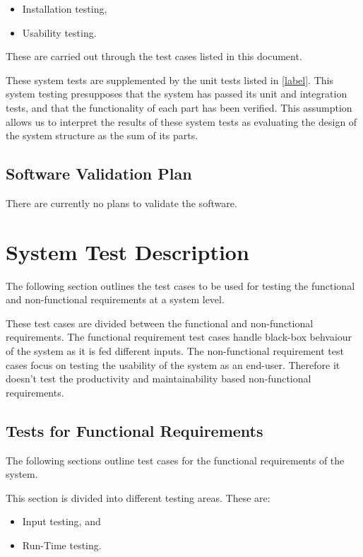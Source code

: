 \documentclass[12pt, titlepage]{article}
\begin{document}
\begin{itemize}
	\item Installation testing,
	\item Usability testing.
\end{itemize}

These are carried out through the test cases listed in this document.

These system tests are supplemented by the unit tests listed in \ref{label}. 
This system testing presupposes that the system has passed its unit and 
integration tests, and that the functionality of each part has been verified. 
This assumption allows us to interpret the results of these system tests as 
evaluating the design of the system structure as the sum of its parts.

\subsection{Software Validation Plan}
There are currently no plans to validate the software.

\section{System Test Description}
The following section outlines the test cases to be used for testing the 
functional and non-functional requirements at a system level.

These test cases are divided between the functional and non-functional 
requirements. The functional requirement test cases handle black-box behvaiour 
of the system as it is fed different inputs. The non-functional requirement 
test cases focus on testing the usability of the system as an end-user. 
Therefore it doesn't test the productivity and maintainability based 
non-functional requirements.

\subsection{Tests for Functional Requirements}
The following sections outline test cases for the functional requirements of 
the system.

This section is divided into different testing areas. These are:

\begin{itemize}
	\item Input testing, and
	\item Run-Time testing.
\end{itemize}
\end{document}
